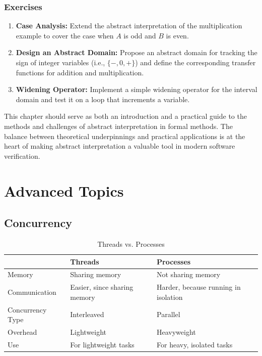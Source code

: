 \documentclass[oneside,11pt,dvipsnames]{book}
\begin{document}
\section{Exercises}

\begin{enumerate}
    \item \textbf{Case Analysis:} Extend the abstract interpretation of the multiplication example to cover the case when \(A\) is odd and \(B\) is even.
    \item \textbf{Design an Abstract Domain:} Propose an abstract domain for tracking the sign of integer variables (i.e., \(\{-,0,+\}\)) and define the corresponding transfer functions for addition and multiplication.
    \item \textbf{Widening Operator:} Implement a simple widening operator for the interval domain and test it on a loop that increments a variable.
\end{enumerate}

\bigskip

\noindent This chapter should serve as both an introduction and a practical guide to the methods and challenges of abstract interpretation in formal methods. The balance between theoretical underpinnings and practical applications is at the heart of making abstract interpretation a valuable tool in modern software verification.

\part{Advanced Topics}
\chapter{Concurrency}\label{chapter:concurrency}


\begin{table}
    \caption{Threads vs. Processes}\label{tab:threads-vs-processes}
    \small
    \centering
    \begin{tabular}{l|l|l}
    \toprule
    &\textbf{Threads} & \textbf{Processes} \\
    \midrule
    Memory & Sharing memory & Not sharing memory\\
    Communication & Easier, since sharing memory & Harder, because running in isolation \\
    Concurrency Type & Interleaved & Parallel \\
    Overhead & Lightweight & Heavyweight\\
    Use & For lightweight tasks & For heavy, isolated tasks \\
    \bottomrule
    \end{tabular}
\end{table}
\end{document}
